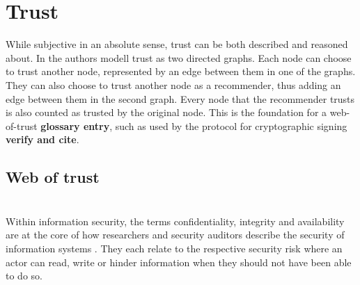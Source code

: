 \documentclass[english, biblatex, digitaloutput]{kththesis}
\begin{document}

\section{Trust}

While subjective in an absolute sense, trust can be both described and reasoned about. In \cite{abdui-rahman_distributed_nodate} the authors modell trust as two directed graphs. Each node can choose to trust another node, represented by an edge between them in one of the graphs. They can also choose to trust another node as a recommender, thus adding an edge between them in the second graph. Every node that the recommender trusts is also counted as trusted by the original node. This is the foundation for a web-of-trust \textbf{glossary entry}, such as used by the  protocol for cryptographic signing \textbf{verify and cite}.

\subsection{}

\subsection{Web of trust}

\subsection{}

\subsection{}

\section{}

Within information security, the terms confidentiality, integrity and availability are at the core of how researchers and security auditors describe the security of information systems \cite{samonas_cia_nodate}. They each relate to the respective security risk where an actor can read, write or hinder information when they should not have been able to do so.
\end{document}
